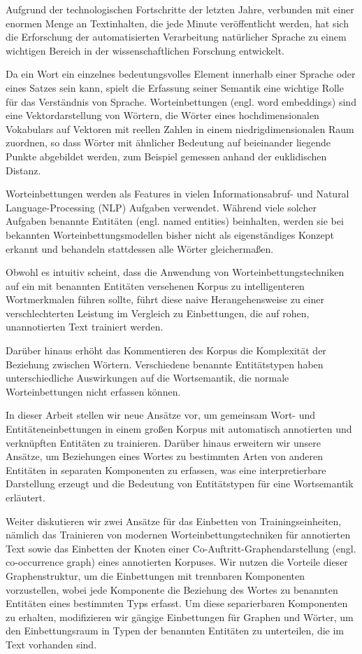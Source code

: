 
Aufgrund der technologischen Fortschritte der letzten Jahre, verbunden mit einer enormen Menge an Textinhalten, die jede Minute veröffentlicht werden, hat sich die  Erforschung der automatisierten Verarbeitung natürlicher Sprache zu einem wichtigen Bereich in der wissenschaftlichen Forschung entwickelt.

Da ein Wort ein einzelnes bedeutungsvolles Element innerhalb einer Sprache oder eines Satzes sein kann, spielt die Erfassung seiner Semantik eine wichtige Rolle für das Verständnis  von Sprache.
Worteinbettungen (engl. word embeddings) sind eine Vektordarstellung von Wörtern, die Wörter eines hochdimensionalen Vokabulars auf Vektoren mit reellen Zahlen in einem niedrigdimensionalen Raum zuordnen, so dass Wörter mit ähnlicher Bedeutung auf beieinander liegende Punkte abgebildet werden, zum Beispiel gemessen anhand der euklidischen Distanz.

Worteinbettungen werden als Features in vielen Informationsabruf- und Natural Language-Processing (NLP) Aufgaben verwendet. Während viele solcher Aufgaben benannte Entitäten (engl. named entities) beinhalten, werden sie bei bekannten Worteinbettungsmodellen bisher nicht als eigenständiges Konzept erkannt und behandeln stattdessen alle Wörter gleichermaßen.

Obwohl es intuitiv scheint, dass die Anwendung von Worteinbettungstechniken auf ein mit benannten Entitäten versehenen Korpus zu intelligenteren Wortmerkmalen führen sollte, führt diese naive Herangehensweise zu einer verschlechterten Leistung im Vergleich zu Einbettungen, die auf rohen, unannotierten Text trainiert werden.

Darüber hinaus erhöht das Kommentieren des Korpus die Komplexität der Beziehung zwischen Wörtern. Verschiedene benannte Entitätstypen haben unterschiedliche Auswirkungen auf die Wortsemantik, die normale Worteinbettungen nicht erfassen können.

In dieser Arbeit stellen wir neue Ansätze vor, um gemeinsam Wort- und Entitäteneinbettungen in einem großen Korpus mit automatisch annotierten und verknüpften Entitäten zu trainieren.
Darüber hinaus erweitern wir unsere Ansätze, um Beziehungen eines Wortes zu bestimmten Arten von anderen Entitäten in separaten Komponenten zu erfassen, was eine interpretierbare Darstellung erzeugt und die Bedeutung von Entitätstypen für eine Wortsemantik erläutert.

Weiter diskutieren wir zwei Ansätze für das Einbetten von Trainingseinheiten, nämlich das Trainieren von modernen Worteinbettungstechniken für annotierten Text sowie das Einbetten der Knoten einer Co-Auftritt-Graphendarstellung (engl. co-occurrence graph) eines annotierten Korpuses. Wir nutzen die Vorteile dieser Graphenstruktur, um die Einbettungen mit trennbaren Komponenten vorzustellen, wobei jede Komponente die Beziehung des Wortes zu benannten Entitäten eines bestimmten Typs erfasst. Um diese separierbaren Komponenten zu erhalten, modifizieren wir gängige Einbettungen für Graphen und Wörter, um den Einbettungsraum in Typen der benannten Entitäten zu unterteilen, die im Text vorhanden sind.

